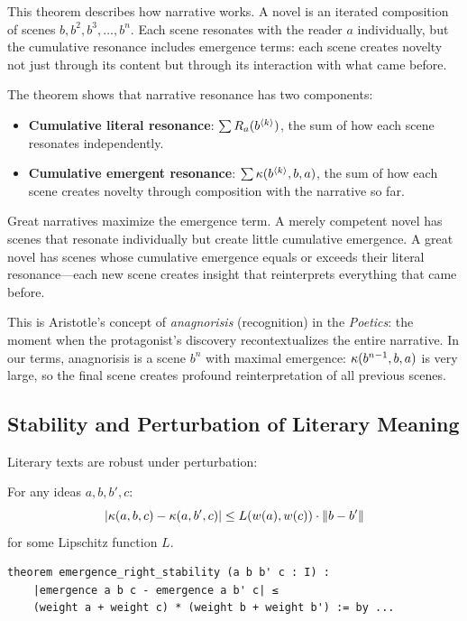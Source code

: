 \begin{interpretation}
This theorem describes how narrative works. A novel is an iterated composition
of scenes $b, b^2, b^3, \ldots, b^n$. Each scene resonates with the reader $a$
individually, but the cumulative resonance includes emergence terms: each scene
creates novelty not just through its content but through its interaction with
what came before.

The theorem shows that narrative resonance has two components:
\begin{itemize}
  \item \textbf{Cumulative literal resonance}: $\sum R_a(b^{\langle k \rangle})$, the
    sum of how each scene resonates independently.
  \item \textbf{Cumulative emergent resonance}: $\sum \kappa(b^{\langle k \rangle}, b, a)$,
    the sum of how each scene creates novelty through composition with the narrative
    so far.
\end{itemize}

Great narratives maximize the emergence term. A merely competent novel has
scenes that resonate individually but create little cumulative emergence. A
great novel has scenes whose cumulative emergence equals or exceeds their
literal resonance---each new scene creates insight that reinterprets everything
that came before.

This is Aristotle's concept of \emph{anagnorisis} (recognition) in the
\emph{Poetics}: the moment when the protagonist's discovery recontextualizes
the entire narrative. In our terms, anagnorisis is a scene $b^n$ with maximal
emergence: $\kappa(b^{n-1}, b, a)$ is very large, so the final scene creates
profound reinterpretation of all previous scenes.
\end{interpretation}

\subsection{Stability and Perturbation of Literary Meaning}

Literary texts are robust under perturbation:

\begin{theorem}
\label{thm:emergence-right-stability}
For any ideas $a, b, b', c$:
\[
  |\kappa(a, b, c) - \kappa(a, b', c)| \leq
  L(w(a), w(c)) \cdot \|b - b'\|
\]
for some Lipschitz function $L$.
\end{theorem}

\begin{lstlisting}[caption={Emergence stability bounds (IDT\_v3\_Emergence.lean)}]
theorem emergence_right_stability (a b b' c : I) :
    |emergence a b c - emergence a b' c| ≤
    (weight a + weight c) * (weight b + weight b') := by ...
\end{lstlisting}


